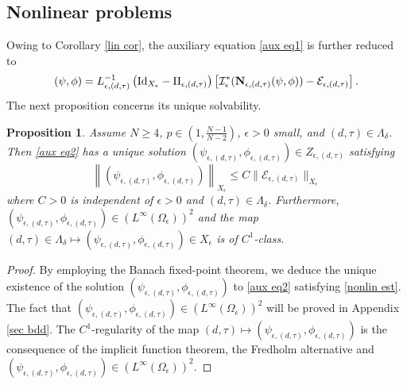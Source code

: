 \documentclass[reqno]{amsart}
\newtheorem{proposition}[theorem]{Proposition}
\theoremstyle{remark}
\newcommand{\ep}{\epsilon}
\newcommand{\mbN}{\mathbf{N}}
\newcommand{\mce}{\mathcal{E}}
\newcommand{\mci}{\mathcal{I}}
\renewcommand{\(}{\left(}
\renewcommand{\)}{\right)}
\numberwithin{equation}{section}
\begin{document}
\subsection{Nonlinear problems}
Owing to Corollary \ref{lin cor}, the auxiliary equation \eqref{aux eq1} is further reduced to
\begin{equation}\label{aux eq2}
(\psi,\phi) = L_{\ep,(d,\tau)}^{-1}\(\textup{Id}_{X_\ep}-\Pi_{\ep,(d,\tau)}\) \left[ \mci^*_\ep(\mbN_{\ep,(d,\tau)}(\psi,\phi))-\mce_{\ep,(d,\tau)}\right].
\end{equation}
The next proposition concerns its unique solvability.
\begin{proposition}\label{nonlin prop}
Assume $N \ge 4$, $p \in (1,\frac{N-1}{N-2})$, $\ep > 0$ small, and $(d,\tau) \in \Lambda_\delta$.
Then \eqref{aux eq2} has a unique solution $(\psi_{\ep,(d,\tau)},\phi_{\ep,(d,\tau)}) \in Z_{\ep,(d,\tau)}$ satisfying
\begin{equation}\label{nonlin est}
\left\|\(\psi_{\ep,(d,\tau)},\phi_{\ep,(d,\tau)}\)\right\|_{X_\ep} \le C\|\mce_{\ep,(d,\tau)}\|_{X_\ep}
\end{equation}
where $C > 0$ is independent of $\ep > 0$ and $(d,\tau) \in \Lambda_\delta$.
Furthermore, $(\psi_{\ep,(d,\tau)},\phi_{\ep,(d,\tau)}) \in (L^{\infty}(\Omega_\ep))^2$ and the map $(d,\tau) \in \Lambda_\delta \mapsto (\psi_{\ep,(d,\tau)},\phi_{\ep,(d,\tau)}) \in {X_\ep}$ is of $C^1$-class.
\end{proposition}
\begin{proof}
By employing the Banach fixed-point theorem, we deduce the unique existence of the solution $(\psi_{\ep,(d,\tau)},\phi_{\ep,(d,\tau)})$ to \eqref{aux eq2} satisfying \eqref{nonlin est}.
The fact that $(\psi_{\ep,(d,\tau)},\phi_{\ep,(d,\tau)}) \in (L^{\infty}(\Omega_\ep))^2$ will be proved in Appendix \ref{sec bdd}.
The $C^1$-regularity of the map $(d,\tau) \mapsto (\psi_{\ep,(d,\tau)},\phi_{\ep,(d,\tau)})$ is the consequence of the implicit function theorem, the Fredholm alternative and $(\psi_{\ep,(d,\tau)},\phi_{\ep,(d,\tau)}) \in (L^{\infty}(\Omega_\ep))^2$.
\end{proof}
\end{document}
